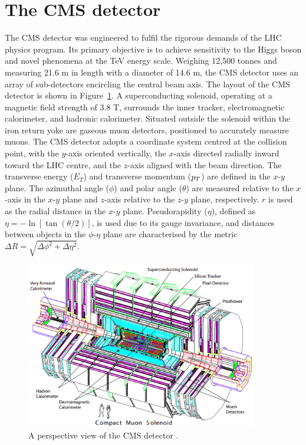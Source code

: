 \section{The CMS detector}

The \ac{CMS} detector was engineered to fulfil the rigorous demands of the \ac{LHC} physics program. 
Its primary objective is to achieve sensitivity to the Higgs boson and novel phenomena at the TeV energy scale. 
Weighing 12,500 tonnes and measuring 21.6 m in length with a diameter of 14.6 m, the \ac{CMS} detector uses an array of sub-detectors encircling the central beam axis. 
The layout of the \ac{CMS} detector is shown in Figure~\ref{fig:CMS_Schematic}.
A superconducting solenoid, operating at a magnetic field strength of 3.8 T, surrounds the inner tracker, electromagnetic calorimeter, and hadronic calorimeter. 
Situated outside the solenoid within the iron return yoke are gaseous muon detectors, positioned to accurately measure muons. 
The \ac{CMS} detector adopts a coordinate system centred at the collision point, with the $y$-axis oriented vertically, the $x$-axis directed radially inward toward the \ac{LHC} centre, and the $z$-axis aligned with the beam direction. 
The transverse energy ($E_T$) and transverse momentum ($p_{T}$) are defined in the $x$-$y$ plane. 
The azimuthal angle ($\phi$) and polar angle ($\theta$) are measured relative to the $x$-axis in the $x$-$y$ plane and $z$-axis relative to the $z$-$y$ plane, respectively. 
$r$ is used as the radial distance in the $x$-$y$ plane.
Pseudorapidity ($\eta$), defined as $\eta = -\ln[\tan(\theta/2)]$, is used due to its gauge invariance, and distances between objects in the $\phi$-$\eta$ plane are characterised by the metric $\Delta R = \sqrt{\Delta\phi^2 + \Delta\eta^2}$. 

\begin{figure}[h]
    \centering
    \includegraphics[width=0.9\textwidth]{Figures/CMS_Detector.png}
    \caption{A perspective view of the \ac{CMS} detector \cite{CMS_Setup}.}
    \label{fig:CMS_Schematic}
\end{figure}

